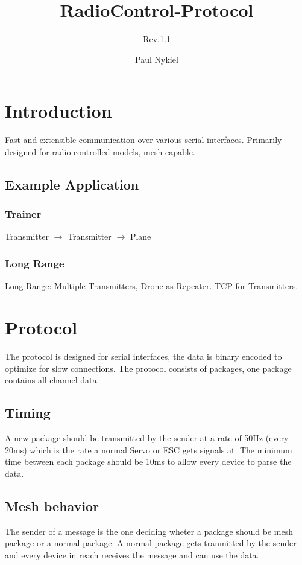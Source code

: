 \documentclass{scrreprt}
\title{RadioControl-Protocol}
\subtitle{Rev.1.1}
\author{Paul Nykiel}
\begin{document}
\maketitle
\tableofcontents

\pagebreak

\chapter{Introduction}
  Fast and extensible communication over various serial-interfaces. Primarily
  designed for radio-controlled models, mesh capable.

\section{Example Application}
\subsection{Trainer}
Transmitter $\to$ Transmitter $\to$ Plane
\subsection{Long Range}
  Long Range: Multiple Transmitters, Drone as Repeater. TCP for Transmitters.

\chapter{Protocol}
The protocol is designed for serial interfaces, the data is binary encoded to
optimize for slow connections. The protocol consists of packages, one package
contains all channel data.

\section{Timing}
A new package should be transmitted by the sender at a rate of 50Hz (every
20ms) which is the rate a normal Servo or ESC gets signals at. The minimum
time between each package should be 10ms to allow every device to parse the
data.

\section{Mesh behavior}
The sender of a message is the one deciding wheter a package should be mesh
package or a normal package. A normal package gets tranmitted by the sender
and every device in reach receives the message and can use the data.
\end{document}
